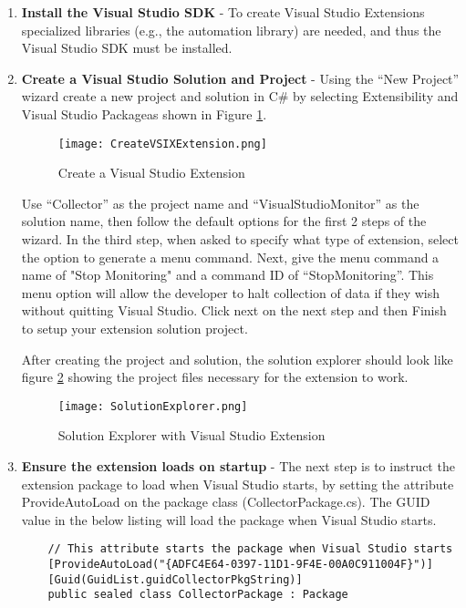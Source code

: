 \begin{enumerate}
\item {\bf Install the Visual Studio SDK} - To create Visual Studio Extensions specialized libraries (e.g., the automation library) are needed, and thus the Visual Studio SDK must be installed.

\item {\bf Create a Visual Studio Solution and Project} - Using the ``New Project'' wizard create a new project and solution in C\# by selecting Extensibility and Visual Studio Packageas shown in Figure \ref{fig:ProjectCreation}.  
\begin{figure}
	\centering
	\texttt{[image: CreateVSIXExtension.png]}
	\caption{Create a Visual Studio Extension}
	\label{fig:ProjectCreation}
\end{figure}

Use ``Collector'' as the project name and ``VisualStudioMonitor'' as the solution name, then follow the default options for the first 2 steps of the wizard.  In the third step, when asked to specify what type of extension, select the option to generate a menu command.  Next, give the menu command a name of "Stop Monitoring" and a command ID of ``StopMonitoring''.  This menu option will allow the developer to halt collection of data if they wish without quitting Visual Studio.  Click next on the next step and then Finish to setup your extension solution project.


After creating the project and solution, the solution explorer should look like figure \ref{fig:SolutionExplorer} showing the project files necessary for the extension to work.
\begin{figure}
	\centering
	\texttt{[image: SolutionExplorer.png]}
	\caption{Solution Explorer with Visual Studio Extension}
	\label{fig:SolutionExplorer}
\end{figure}


\item {\bf Ensure the extension loads on startup} - The next step is to instruct the extension package to load when Visual Studio starts, by setting the attribute ProvideAutoLoad on the package class (CollectorPackage.cs). The GUID value in the below listing will load the package when Visual Studio starts.

\begin{lstlisting}
    // This attribute starts the package when Visual Studio starts 
    [ProvideAutoLoad("{ADFC4E64-0397-11D1-9F4E-00A0C911004F}")]
    [Guid(GuidList.guidCollectorPkgString)]
    public sealed class CollectorPackage : Package
\end{lstlisting}

\end{enumerate}

